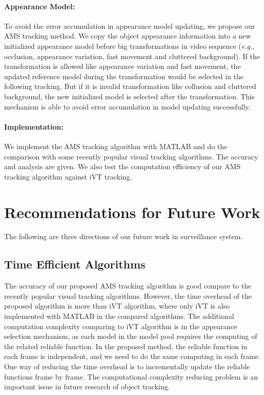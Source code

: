 \paragraph{Appearance Model:} To avoid the error accumulation in appearance model updating, we propose our AMS tracking method. We copy the object appearance information into a new initialized appearance model before big transformations in video sequence (\emph{e.g.}, occlusion, appearance variation, fast movement and cluttered background). If the transformation is allowed like appearance variation and fast movement, the updated reference model during the transformation would be selected in the following tracking. But if it is invalid transformation like collusion and cluttered background, the new initialized model is selected after the transformation. This mechanism is able to avoid error accumulation in model updating successfully.

\paragraph{Implementation:} We implement the AMS tracking algorithm with MATLAB and do the comparison with some recently popular visual tracking algorithms. The accuracy and analysis are given. We also test the computation efficiency of our AMS tracking algorithm against iVT \cite{iVT2008} tracking.

\section{Recommendations for Future Work}\label{sct:FutureWork}
\indent \indent The following are three directions of our future work in surveillance system.

\subsection{Time Efficient Algorithms}
\indent \indent The accuracy of our proposed AMS tracking algorithm is good compare to the recently popular visual tracking algorithms. However, the time overhead of the proposed algorithm is more than iVT algorithm, where only iVT is also implemented with MATLAB in the compared algorithms. The additional computation complexity comparing to iVT algorithm is in the appearance selection mechanism, as each model in the model pool requires the computing of the related reliable function. In the proposed method, the reliable function in each frame is independent, and we need to do the same computing in each frame. One way of reducing the time overhead is to incrementally update the reliable functions frame by frame. The computational complexity reducing problem is an important issue in future research of object tracking.

